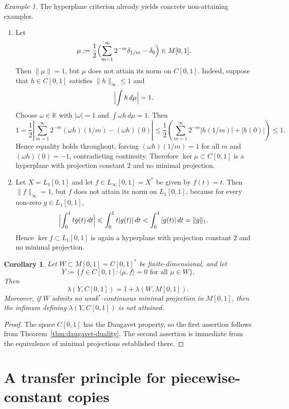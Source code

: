 \documentclass[11pt]{amsart}
\numberwithin{equation}{section}
\newtheorem{corollary}[theorem]{Corollary}
\theoremstyle{definition}
\theoremstyle{remark}
\newtheorem{example}[theorem]{Example}
\newcommand{\K}{\mathbb K}
\begin{document}
\begin{example}
\label{ex:hyperplanes}
The hyperplane criterion already yields concrete non-attaining examples.
\begin{enumerate}[label=\textup{(\alph*)}]
\item Let
\[
\mu:=\frac12\Bigl(\sum_{m=1}^\infty 2^{-m}\delta_{1/m}-\delta_0\Bigr)\in M[0,1].
\]
Then $\|\mu\|=1$, but $\mu$ does not attain its norm on $C[0,1]$. Indeed, suppose that $h\in C[0,1]$ satisfies $\|h\|_\infty\leqslant 1$ and
\[
\Bigl|\int h\,d\mu\Bigr|=1.
\]
Choose $\omega\in\K$ with $|\omega|=1$ and $\int \omega h\,d\mu=1$. Then
\[
1
=
\frac12\left|\sum_{m=1}^\infty 2^{-m}(\omega h)(1/m)-(\omega h)(0)\right|
\leqslant
\frac12\left(\sum_{m=1}^\infty 2^{-m}|h(1/m)|+|h(0)|\right)
\leqslant 1.
\]
Hence equality holds throughout, forcing $(\omega h)(1/m)=1$ for all $m$ and $(\omega h)(0)=-1$, contradicting continuity. Therefore $\ker\mu\subset C[0,1]$ is a hyperplane with projection constant $2$ and no minimal projection.
\item Let $X=L_1[0,1]$ and let $f\in L_\infty[0,1]=X^*$ be given by $f(t)=t$. Then $\|f\|_\infty=1$, but $f$ does not attain its norm on $L_1[0,1]$, because for every non-zero $g\in L_1[0,1]$,
\[
\Bigl|\int_0^1 t g(t)\,dt\Bigr|\leqslant \int_0^1 t|g(t)|\,dt < \int_0^1 |g(t)|\,dt=\|g\|_1.
\]
Hence $\ker f\subset L_1[0,1]$ is again a hyperplane with projection constant $2$ and no minimal projection.
\end{enumerate}
\end{example}

\begin{corollary}
\label{cor:C01-annihilator}
Let $W\subset M[0,1]=C[0,1]^*$ be finite-dimensional, and let
\[
Y:=\{f\in C[0,1]: \langle \mu,f\rangle =0\text{ for all }\mu\in W\}.
\]
Then
\[
\lambda(Y,C[0,1])=1+\lambda(W,M[0,1]).
\]
Moreover, if $W$ admits no weak$^*$-continuous minimal projection in $M[0,1]$, then the infimum defining $\lambda(Y,C[0,1])$ is not attained.
\end{corollary}

\begin{proof}
The space $C[0,1]$ has the Daugavet property, so the first assertion follows from Theorem~\ref{thm:daugavet-duality}. The second assertion is immediate from the equivalence of minimal projections established there.
\end{proof}

\section{A transfer principle for piecewise-constant copies}
\label{sec:transfer}
\end{document}
